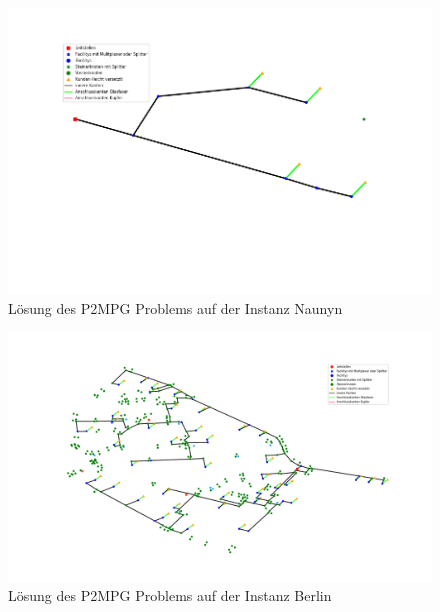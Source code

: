 \documentclass[11pt,a4paper]{article}
\theoremstyle{my_th_style1}
\begin{document}
\begin{figure}[!htbp]
	\begin{center}
		\begin{minipage}{15.0cm}
			\includegraphics[width=1\textwidth]{./Bilder/P2MPG_Naunyn_demand1_duration0}
			\caption{Lösung des P2MPG Problems auf der Instanz Naunyn}
			\label{p2mpg_n_pic}
		\end{minipage}
	\end{center}
\end{figure}

\begin{figure}[!htbp]
	\begin{center}
		\begin{minipage}{15.0cm}
			\includegraphics[width=1\textwidth]{./Bilder/P2MPG_Berlin_demand1_duration0}
			\caption{Lösung des P2MPG Problems auf der Instanz Berlin}
			\label{p2mpg_b_pic}
		\end{minipage}
	\end{center}
\end{figure}
\end{document}
